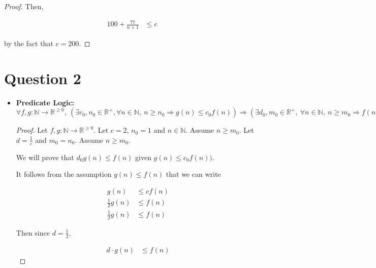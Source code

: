 \documentclass[12pt]{article}
\begin{document}
\begin{enumerate}[a.]
\begin{proof}
        \bigskip

        Then,

        \begin{align}
            100 + \frac{77}{n+1} &\leq c
        \end{align}

        by the fact that $c = 200$.
    \end{proof}

\end{enumerate}

\section*{Question 2}
\begin{itemize}
    \item

    \textbf{Predicate Logic:} $\forall f,g:\mathbb{N} \to \mathbb{R}^{\geq 0},\:
    (\exists c_0,n_0 \in \mathbb{R}^{+}, \forall n \in \mathbb{N}, \:n \geq
    n_0 \Rightarrow g(n) \leq c_0f(n)) \Rightarrow (\exists d_0,m_0 \in
    \mathbb{R}^{+},\:\forall n \in \mathbb{N},\:n \geq m_0 \Rightarrow f(n) \geq d g(n))$

    \bigskip

    \begin{proof}

    Let $f,g:\mathbb{N} \to \mathbb{R}^{\geq 0}$. Let $c = 2$, $n_0 = 1$ and
    $n \in \mathbb{N}$. Assume $n \geq m_0$. Let $d = \frac{1}{c}$ and $m_0 = n_0$.
    Assume $n \geq m_0$.

    \bigskip

    We will prove that $d_0g(n) \leq f(n)$ given $g(n) \leq c_0f(n))$.

    \bigskip

    It follows from the assumption $g(n) \leq f(n)$ that we can write

    \setcounter{equation}{0}
    \begin{align}
        g(n) &\leq cf(n)\\
        \frac{1}{2} g(n) &\leq f(n)\\
        \frac{1}{2} g(n) &\leq f(n)
    \end{align}

    \bigskip

    Then since $d = \frac{1}{2}$,

    \begin{align}
        d \cdot g(n) &\leq f(n)
    \end{align}
    \end{proof}
\end{itemize}
\end{document}
